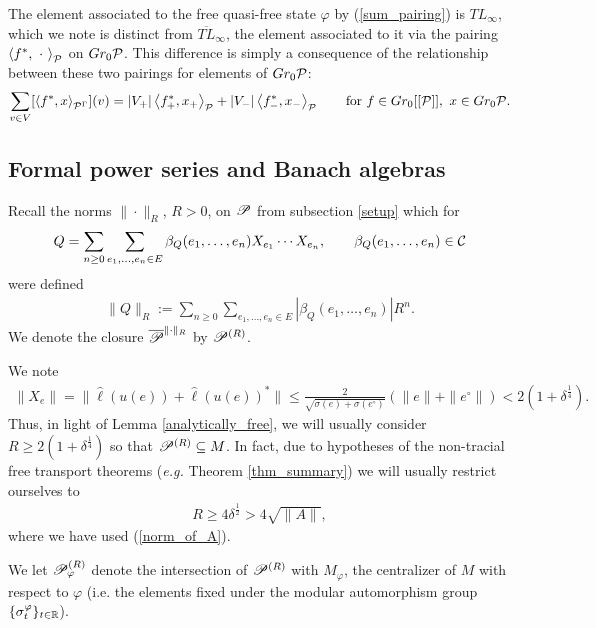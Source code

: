 \begin{rem}\label{inner_product_comparison}
The element associated to the free quasi-free state $\varphi$ by (\ref{sum_pairing}) is $TL_\infty$, which we note is distinct from $\overline{TL}_\infty$, the element associated to it via the pairing $\<f^*,\ \cdot\ \>_{\mc{P}}$ on $Gr_0\mc{P}$. This difference is simply a consequence of the relationship between these two pairings for elements of $Gr_0\mc{P}$:
\[
\sum_{v\in V}[\<f^*, x\>_{\mc{P}^\Gamma}](v) = |V_+|\<f^*_+, x_+\>_\mc{P} + |V_-| \<f^*_-, x_-\>_{\mc{P}} \qquad \text{for }f \in Gr_0[[\mc{P}]],\ x\in Gr_0\mc{P}.
\]
\end{rem}





\subsection{Formal power series and Banach algebras}

Recall the norms $\|\cdot\|_R$, $R>0$, on $\P$ from subsection \ref{setup} which for
\begin{align*}
Q=\sum_{n\geq 0} \sum_{e_1,\ldots, e_n\in E} \beta_Q(e_1,\ldots, e_n) X_{e_1}\cdots X_{e_n},\qquad \beta_Q(e_1,\ldots, e_n)\in \C
\end{align*}
were defined
\begin{align*}
\|Q\|_R := \sum_{n\geq 0} \sum_{e_1,\ldots, e_n\in E} |\beta_Q(e_1,\ldots, e_n)| R^n.
\end{align*}
We denote the closure $\overline{\P}^{\|\cdot\|_R}$ by $\P^{(R)}$. 



We note
\begin{align*}
\|X_e\| = \|\hat{\ell}(u(e))+\hat{\ell}(u(e))^*\| \leq \frac{2}{\sqrt{\sigma(e)+\sigma(e^\circ)}}(\|e\|+\|e^\circ\|) <2(1+\delta^\frac{1}{4}).
\end{align*}
Thus, in light of Lemma \ref{analytically_free}, we will usually consider $R\geq 2(1+\delta^\frac{1}{4})$ so that $\P^{(R)}\subset M$. In fact, due to hypotheses of the non-tracial free transport theorems (\emph{e.g.} Theorem \ref{thm_summary}) we will usually restrict ourselves to
\begin{align*}
R\geq 4\delta^\frac{1}{2} >4\sqrt{\|A\|},
\end{align*}
where we have used (\ref{norm_of_A}).

We let $\P^{(R)}_\varphi$ denote the intersection of $\P^{(R)}$ with $M_\varphi$, the centralizer of $M$ with respect to $\varphi$ (i.e. the elements fixed under the modular automorphism group $\{\sigma_t^\varphi\}_{t\in\R}$).

